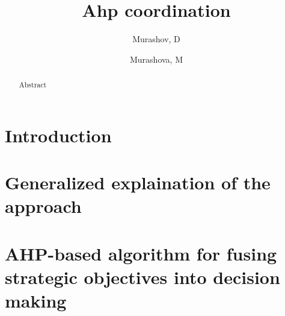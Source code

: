 \documentclass{article}
\author{Murashov, D \and Murashova, M}
\title{Ahp coordination}
\begin{document}
    \maketitle

    \begin{abstract}
        Abstract
    \end{abstract}

    \section{Introduction}

    

    

    \section{Generalized explaination of the approach}

    

    \section{AHP-based algorithm for fusing strategic objectives into decision making}

    

    \medskip

    

    
\end{document}
